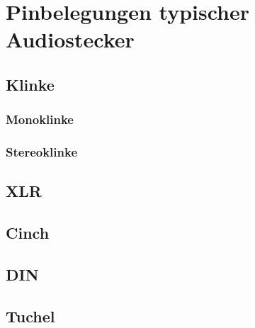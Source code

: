 \chapter{Pinbelegungen typischer Audiostecker}
\thispagestyle{empty}

\section{Klinke}
\subsection{Monoklinke}
\subsection{Stereoklinke}

\section{XLR}

\section{Cinch}

\section{DIN}

\section{Tuchel}

